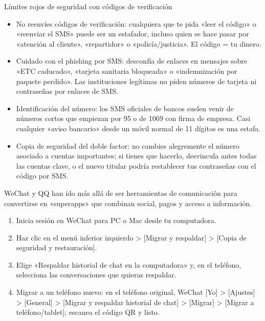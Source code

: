 \begin{tcbwarn}{Límites rojos de seguridad con códigos de verificación}
\begin{itemize}
  \item No reenvíes códigos de verificación: cualquiera que te pida «leer el código» o «reenviar el SMS» puede ser un estafador, incluso quien se hace pasar por «atención al cliente», «repartidor» o «policía/justicia». El código = tu dinero.
  \item Cuidado con el phishing por SMS: desconfía de enlaces en mensajes sobre «ETC caducado», «tarjeta sanitaria bloqueada» o «indemnización por paquete perdido». Las instituciones legítimas no piden números de tarjeta ni contraseñas por enlaces de SMS.
  \item Identificación del número: los SMS oficiales de bancos suelen venir de números cortos que empiezan por 95 o de 1069 con firma de empresa. Casi cualquier «aviso bancario» desde un móvil normal de 11 dígitos es una estafa.
  \item Copia de seguridad del doble factor: no cambies alegremente el número asociado a cuentas importantes; si tienes que hacerlo, desvincula antes todas las cuentas clave, o el nuevo titular podría restablecer tus contraseñas con el código por SMS.
\end{itemize}

\end{tcbwarn}


WeChat y QQ han ido más allá de ser herramientas de comunicación para convertirse en «superapps» que combinan social, pagos y acceso a información.


\begin{enumerate}
  \item Inicia sesión en WeChat para PC o Mac desde tu computadora.
  \item Haz clic en el menú inferior izquierdo > [Migrar y respaldar] > [Copia de seguridad y restauración].
  \item Elige «Respaldar historial de chat en la computadora» y, en el teléfono, selecciona las conversaciones que quieras respaldar.
  \item Migrar a un teléfono nuevo: en el teléfono original, WeChat [Yo] > [Ajustes] > [General] > [Migrar y respaldar historial de chat] > [Migrar] > [Migrar a teléfono/tablet]; escanea el código QR y listo.
\end{enumerate}

